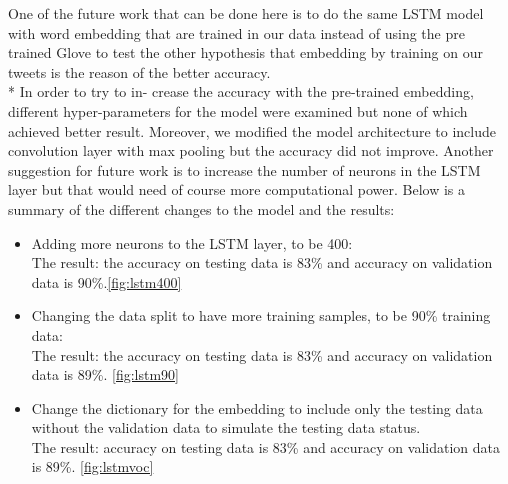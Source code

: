 One of the future work that can be done here is to do the same LSTM model with word embedding that are trained in our data instead of using the pre trained Glove to test the other hypothesis that embedding by training on our tweets is the reason of the better accuracy. 
\\* In order to try to in- crease the accuracy with the pre-trained embedding, different hyper-parameters for the model were examined but none of which achieved better result. Moreover, we modified the model architecture to include convolution layer with max pooling but the accuracy did not improve. Another suggestion for future work is to increase the number of neurons in the LSTM layer but that would need of course more computational power. Below is a summary of the different changes to the model and the results:
\begin{itemize}
\item Adding more neurons to the LSTM layer, to be 400:
\\The result: the accuracy on testing data is 83\% and accuracy on validation data is 90\%.\cref{fig:lstm400}
\item Changing the data split to have more training samples, to be 90\% training data:
\\The result: the accuracy on testing data is 83\% and accuracy on validation data is 89\%. \cref{fig:lstm90}
\item Change the dictionary for the embedding to include only the testing data without the validation data to simulate the testing data status.
\\ The result:  accuracy on testing data is 83\% and accuracy on validation data is 89\%. \cref{fig:lstmvoc}
\end{itemize}


